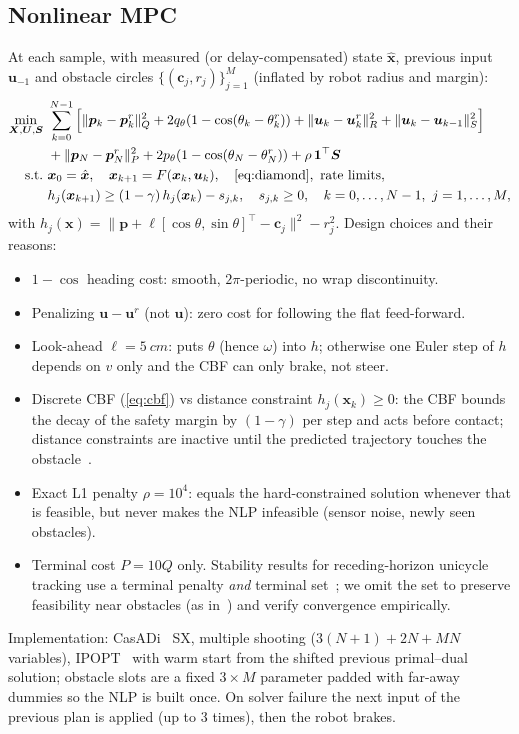 \documentclass[11pt,a4paper]{article}
\begin{document}
\subsection{Nonlinear MPC}
At each sample, with measured (or delay-compensated) state $\hat{\bm x}$, previous input $\bm u_{-1}$ and obstacle circles $\{(\bm c_j,r_j)\}_{j=1}^{M}$ (inflated by robot radius and margin):
\begin{align}
\min_{\bm X,\bm U,\bm S}\ & \sum_{k=0}^{N-1}\Big[\|\bm p_k-\bm p_k^r\|^2_{Q}+2q_\theta(1-\cos(\theta_k-\theta^r_k))+\|\bm u_k-\bm u^r_k\|^2_R+\|\bm u_k-\bm u_{k-1}\|^2_{S}\Big] \nonumber\\
&+\|\bm p_N-\bm p_N^r\|^2_{P}+2p_\theta(1-\cos(\theta_N-\theta^r_N)) + \rho\,\mathbf{1}^\top\bm S \label{eq:cost}\\
\text{s.t.}\ & \bm x_0=\hat{\bm x},\quad \bm x_{k+1}=F(\bm x_k,\bm u_k),\quad \eqref{eq:diamond},\ \text{rate limits},\nonumber\\
& h_j(\bm x_{k+1})\ge(1-\gamma)\,h_j(\bm x_k)-s_{j,k},\quad s_{j,k}\ge0,\quad k=0,\dots,N-1,\ j=1,\dots,M, \label{eq:cbf}
\end{align}
with $h_j(\bm x)=\|\bm p+\ell[\cos\theta,\sin\theta]^\top-\bm c_j\|^2-r_j^2$. Design choices and their reasons:
\begin{itemize}
\item $1-\cos$ heading cost: smooth, $2\pi$-periodic, no wrap discontinuity.
\item Penalizing $\bm u-\bm u^r$ (not $\bm u$): zero cost for following the flat feed-forward.
\item Look-ahead $\ell=\SI{5}{cm}$: puts $\theta$ (hence $\omega$) into $h$; otherwise one Euler step of $h$ depends on $v$ only and the CBF can only brake, not steer.
\item Discrete CBF (\ref{eq:cbf}) vs distance constraint $h_j(\bm x_k)\ge0$: the CBF bounds the decay of the safety margin by $(1-\gamma)$ per step and acts before contact; distance constraints are inactive until the predicted trajectory touches the obstacle~\cite{zeng2021mpccbf}.
\item Exact L1 penalty $\rho=10^4$: equals the hard-constrained solution whenever that is feasible, but never makes the NLP infeasible (sensor noise, newly seen obstacles).
\item Terminal cost $P=10Q$ only. Stability results for receding-horizon unicycle tracking use a terminal penalty \emph{and} terminal set~\cite{gu2006}; we omit the set to preserve feasibility near obstacles (as in~\cite{salimi2021}) and verify convergence empirically.
\end{itemize}
Implementation: CasADi~\cite{casadi} SX, multiple shooting ($3(N{+}1)+2N+MN$ variables), IPOPT~\cite{wachter2006} with warm start from the shifted previous primal--dual solution; obstacle slots are a fixed $3\times M$ parameter padded with far-away dummies so the NLP is built once. On solver failure the next input of the previous plan is applied (up to 3 times), then the robot brakes.
\end{document}
